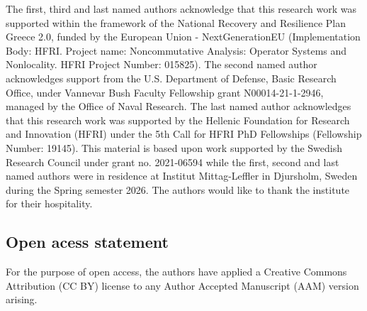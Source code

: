 \documentclass[11pt]{amsart}
\numberwithin{equation}{section}
\theoremstyle{plain}
\theoremstyle{definition}
\theoremstyle{remark}
\begin{document}
The first, third and last named authors acknowledge that this research work was supported within the framework of the National Recovery and Resilience Plan Greece 2.0, funded by the European Union - NextGenerationEU (Implementation Body: HFRI. Project name: Noncommutative Analysis: Operator Systems and Nonlocality. HFRI Project Number: 015825).
The second named author acknowledges support from the U.S. Department of Defense, Basic Research Office, under Vannevar Bush Faculty Fellowship grant N00014-21-1-2946, managed by the Office of Naval Research. 
The last named author acknowledges that this research work was supported by the Hellenic Foundation for Research and Innovation (HFRI) under the 5th Call for HFRI PhD Fellowships (Fellowship Number: 19145).
This material is based upon work supported by the Swedish Research Council under grant no. 2021-06594 while the first, second and last named authors were in residence at Institut Mittag-Leffler in Djursholm, Sweden during the Spring semester 2026.
The authors would like to thank the institute for their hospitality.

\subsection*{Open acess statement}
For the purpose of open access, the authors have applied a Creative
Commons Attribution (CC BY) license to any Author Accepted Manuscript (AAM) version
arising.
\end{document}
